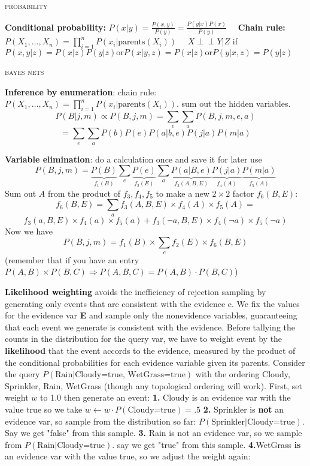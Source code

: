 \documentclass[10pt,twocolumn]{article}
\begin{document}
\newcommand{\Perp}{\perp \! \! \! \perp}
\begin{center}\textsc{probability}\end{center} 	
\textbf{Conditional probability:} $P(x|y)=\frac{P(x,y)}{P(y)}=\frac{P(y|x)P(x)}{P(y)}  \quad$ {\bf Chain rule:}  $P(X_1,\ldots,X_n)=\displaystyle\prod_{i=1}^nP(x_i|\text{parents}(X_i))\quad$ {\bf $X\Perp Y|Z$} if $P(x,y|z)=P(x|z)P(y|z) \text{or} P(x|y,z)=P(x|z) \text{or} P(y|x,z)=P(y|z)$

	
\begin{center}\textsc{bayes nets}\end{center} 

\textbf{Inference by enumeration}: chain rule: $P(X_1,\ldots,X_n)=\displaystyle\prod_{i=1}^nP(x_i|\text{parents}(X_i))$. sum out the hidden variables.
	\[P(B|j,m)\propto P(B,j,m)=\displaystyle\sum_e \displaystyle\sum_a P(B,j,m,e,a)\]
	\[=\displaystyle\sum_e	\displaystyle\sum_a	P(b)P(e)P(a|b,e)P(j|a)P(m|a)\]
	
\textbf{Variable elimination}: do a calculation once and save it for later use \[P(B,j,m)=\underbrace{P(B)}_{f_1(B)} \displaystyle\sum_e \underbrace{P(e)}_{f_2(E)} \displaystyle\sum_a \underbrace{P(a|B,e)}_{f_3(A,B,E)} \underbrace{P(j|a)}_{f_4(A)} \underbrace{P(m|a)}_{f_5(A)}\] Sum out $A$ from the product of $f_3,f_4,f_5$ to make a new $2\times2$ factor $f_6(B,E)$:\[f_6(B,E) = \displaystyle\sum_a f_3(A,B,E)\times f_4(A)\times f_5(A) =\] \[f_3(a,B,E)\times f_4(a)\times f_5(a) + f_3(\neg a,B,E)\times f_4(\neg a)\times f_5(\neg a)\] Now we have \[P(B,j,m)=f_1(B)\times \displaystyle\sum_e f_2(E)\times f_6(B,E)\] (remember that  if you have an entry $P(A,B)\times P(B,C) \Rightarrow P(A,B,C) = P(A,B)\cdot P(B,C)$)

{\bf Likelihood weighting} avoids the inefficiency of rejection sampling by generating only events that are consistent with the evidence e. We fix the values for the evidence var {\bf E} and sample only the nonevidence variables, guaranteeing that each event we generate is consistent with the evidence. Before tallying the counts in the distribution for the query var, we have to weight event by the {\bf likelihood} that the event accords to the evidence, measured by the product of the conditional probabilities for each evidence variable given its parents. Consider the query $P(\text{Rain} | \text{Cloudy=true, WetGrass=true})$ with the ordering Cloudy, Sprinkler, Rain, WetGrass (though any topological ordering will work). First, set weight $w$ to 1.0 then generate an event: \textbf{1.} Cloudy is an evidence var with the value true so we take $w\leftarrow w\cdot P(\text{Cloudy=true})=.5$
\textbf{2.} Sprinkler is {\bf not} an evidence var, so sample from the distribution so far: $P(\text{Sprinkler}|\text{Cloudy=true})$. Say we get "false" from this sample.
	\textbf{3.} Rain is not an evidence var, so we sample from $P(\text{Rain}|\text{Cloudy=true})$. say we get "true" from this sample.
	\textbf{4.}WetGrass {\bf is} an evidence var with the value true, so we adjust the weight again:
	
\end{document}
